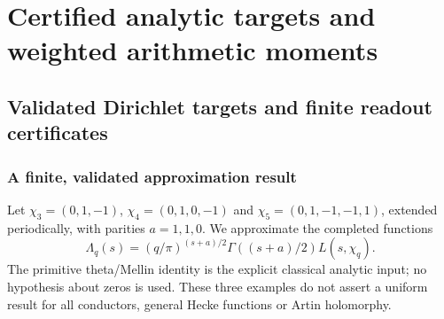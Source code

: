 \documentclass[11pt,oneside,openany]{book}
\theoremstyle{definition}\newtheorem{definition}[theorem]{Definition}
\theoremstyle{remark}\newtheorem{remark}[theorem]{Remark}
\begin{document}
\part{Certified analytic targets and weighted arithmetic moments}
\chapter{Validated Dirichlet targets and finite readout certificates}
\section{A finite, validated approximation result}
Let $\chi_3=(0,1,-1)$, $\chi_4=(0,1,0,-1)$ and
$\chi_5=(0,1,-1,-1,1)$, extended periodically, with parities $a=1,1,0$.
We approximate the completed functions
\[
 \Lambda_q(s)=(q/\pi)^{(s+a)/2}\Gamma((s+a)/2)L(s,\chi_q).
\]
The primitive theta/Mellin identity is the explicit classical analytic input;
no hypothesis about zeros is used. These three examples do not assert a
uniform result for all conductors, general Hecke functions or Artin holomorphy.
\end{document}
